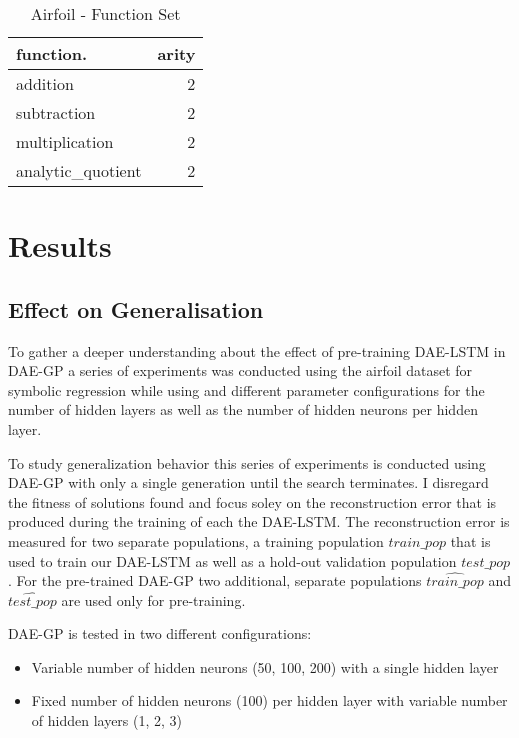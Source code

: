 \documentclass[
  11pt,
]{article}
\providecommand{\tightlist}{%
  \setlength{\itemsep}{0pt}\setlength{\parskip}{0pt}}
\begin{document}
\begin{table}[!h]

\caption{\label{tab:airfoil_function_set}Airfoil - Function Set}
\centering
\begin{tabular}[t]{l|r}
\hline
\textbf{function.} & \textbf{arity}\\
\hline
addition & 2\\
\hline
subtraction & 2\\
\hline
multiplication & 2\\
\hline
analytic\_quotient & 2\\
\hline
\end{tabular}
\end{table}

\hypertarget{results}{%
\section{Results}\label{results}}

\hypertarget{effect-on-generalisation}{%
\subsection{Effect on Generalisation}\label{effect-on-generalisation}}

To gather a deeper understanding about the effect of pre-training
DAE-LSTM in DAE-GP a series of experiments was conducted using the
airfoil dataset for symbolic regression while using and different
parameter configurations for the number of hidden layers as well as the
number of hidden neurons per hidden layer.

To study generalization behavior this series of experiments is conducted
using DAE-GP with only a single generation until the search terminates.
I disregard the fitness of solutions found and focus soley on the
reconstruction error that is produced during the training of each the
DAE-LSTM. The reconstruction error is measured for two separate
populations, a training population \(train\_pop\) that is used to train
our DAE-LSTM as well as a hold-out validation population \(test\_pop\).
For the pre-trained DAE-GP two additional, separate populations
\(\hat{train\_pop}\) and \(\hat{test\_pop}\) are used only for
pre-training.

DAE-GP is tested in two different configurations:

\begin{itemize}
\tightlist
\item
  Variable number of hidden neurons (50, 100, 200) with a single hidden
  layer
\item
  Fixed number of hidden neurons (100) per hidden layer with variable
  number of hidden layers (1, 2, 3)
\end{itemize}
\end{document}
